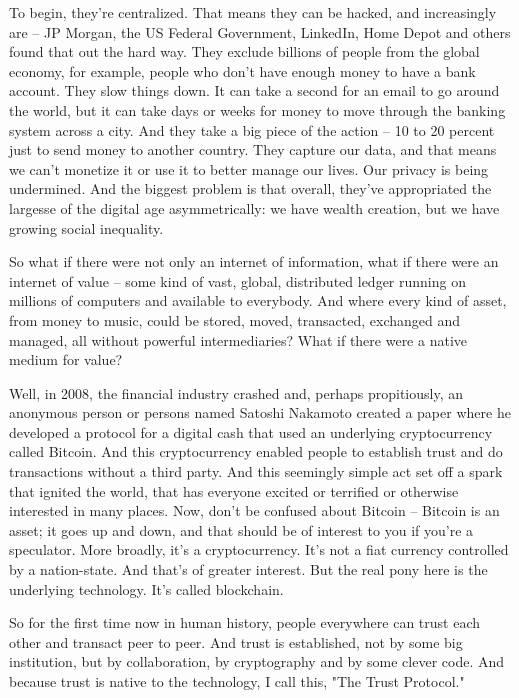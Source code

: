 \documentclass[a4paper]{article}
\begin{document}
To begin, they're centralized. That means they can be hacked, and increasingly are -- JP Morgan, the US Federal Government, LinkedIn, Home Depot and others found that out the hard way. They exclude billions of people from the global economy, for example, people who don't have enough money to have a bank account. They slow things down. It can take a second for an email to go around the world, but it can take days or weeks for money to move through the banking system across a city. And they take a big piece of the action -- 10 to 20 percent just to send money to another country. They capture our data, and that means we can't monetize it or use it to better manage our lives. Our privacy is being undermined. And the biggest problem is that overall, they've appropriated the largesse of the digital age asymmetrically: we have wealth creation, but we have growing social inequality.

So what if there were not only an internet of information, what if there were an internet of value -- some kind of vast, global, distributed ledger running on millions of computers and available to everybody. And where every kind of asset, from money to music, could be stored, moved, transacted, exchanged and managed, all without powerful intermediaries? What if there were a native medium for value?

Well, in 2008, the financial industry crashed and, perhaps propitiously, an anonymous person or persons named Satoshi Nakamoto created a paper where he developed a protocol for a digital cash that used an underlying cryptocurrency called Bitcoin. And this cryptocurrency enabled people to establish trust and do transactions without a third party. And this seemingly simple act set off a spark that ignited the world, that has everyone excited or terrified or otherwise interested in many places. Now, don't be confused about Bitcoin -- Bitcoin is an asset; it goes up and down, and that should be of interest to you if you're a speculator. More broadly, it's a cryptocurrency. It's not a fiat currency controlled by a nation-state. And that's of greater interest. But the real pony here is the underlying technology. It's called blockchain.

So for the first time now in human history, people everywhere can trust each other and transact peer to peer. And trust is established, not by some big institution, but by collaboration, by cryptography and by some clever code. And because trust is native to the technology, I call this, "The Trust Protocol."
\end{document}
